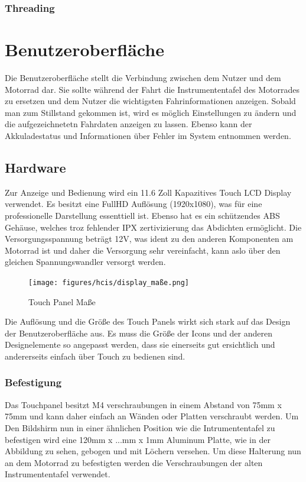 \subsubsection{Threading}

\newpage


\section{Benutzeroberfläche}
Die Benutzeroberfläche stellt die Verbindung zwischen dem Nutzer und dem Motorrad dar. Sie sollte während der Fahrt die Instrumententafel des Motorrades zu ersetzen und dem Nutzer die wichtigsten Fahrinformationen anzeigen. Sobald man zum Stillstand gekommen ist, wird es möglich Einstellungen zu ändern und die aufgezeichnetetn Fahrdaten anzeigen zu lassen. Ebenso kann der Akkuladestatus und Informationen über Fehler im System entnommen werden.

\subsection{Hardware}

Zur Anzeige und Bedienung wird ein 11.6 Zoll Kapazitives Touch LCD Display verwendet. Es besitzt eine FullHD Auflösung (1920x1080), was für eine professionelle Darstellung essenttiell ist. Ebenso hat es ein schützendes ABS Gehäuse, welches troz fehlender IPX zertivizierung das Abdichten ermöglicht. Die Versorgungsspannung beträgt 12V, was ident zu den anderen Komponenten am Motorrad ist und daher die Versorgung sehr vereinfacht, kann aslo über den gleichen Spannungswandler versorgt werden.

\begin{figure}[H]
	\begin{center}
		\texttt{[image: figures/hcis/display\_maße.png]}
		\caption{Touch Panel Maße}
		\label{fig:panel}
	\end{center}
\end{figure}

Die Auflösung und die Größe des Touch Panels wirkt sich stark auf das Design der Benutzeroberfläche aus. Es muss die Größe der Icons und der anderen Designelemente so angepasst werden, dass sie einerseits gut ersichtlich und andererseits einfach über Touch zu bedienen sind. 

\newpage

\subsubsection{Befestigung}
Das Touchpanel besitzt M4 verschraubungen in einem Abstand von 75mm x 75mm und kann daher einfach an Wänden oder Platten verschraubt werden. Um Den Bildshirm nun in einer ähnlichen Position wie die Intrumententafel zu befestigen wird eine 120mm x ...mm x 1mm Aluminum Platte, wie in der Abbildung zu sehen, gebogen und mit Löchern versehen. Um diese Halterung nun an dem Motorrad zu befestigten werden die Verschraubungen der alten Instrumententafel verwendet.

